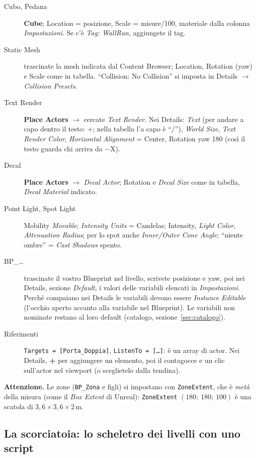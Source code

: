 \documentclass[a4paper,10pt]{article}
\newcommand{\nodo}[1]{\textsf{\textbf{#1}}}
\newcommand{\var}[1]{\texttt{#1}}
\newcommand{\tasto}[1]{\fbox{\footnotesize\textsf{#1}}}
\newcommand{\attenzione}[1]{\par\smallskip\noindent\colorbox{orange!12}{\parbox{\dimexpr\linewidth-2\fboxsep}{\small\textbf{Attenzione.} #1}}\par\smallskip}
\begin{document}
\begin{description}
  \item[Cubo, Pedana] \nodo{Cube}; Location = posizione, Scale = misure/100, materiale dalla colonna \emph{Impostazioni}. Se c'è \emph{Tag: WallRun}, aggiungete il tag.
  \item[Static Mesh] trascinate la mesh indicata dal Content Browser; Location, Rotation (yaw) e Scale come in tabella. ``Collision: No Collision'' si imposta in Details $\rightarrow$ \emph{Collision Presets}.
  \item[Text Render] \nodo{Place Actors} $\rightarrow$ cercate \emph{Text Render}. Nei Details: \emph{Text} (per andare a capo dentro il testo: \tasto{Shift}+\tasto{Invio}; nella tabella l'a capo è ``/''), \emph{World Size}, \emph{Text Render Color}, \emph{Horizontal Alignment} = Center, Rotation yaw 180 (così il testo guarda chi arriva da $-$X).
  \item[Decal] \nodo{Place Actors} $\rightarrow$ \emph{Decal Actor}; Rotation e \emph{Decal Size} come in tabella, \emph{Decal Material} indicato.
  \item[Point Light, Spot Light] Mobility \emph{Movable}; \emph{Intensity Units} = Candelas; Intensity, \emph{Light Color}, \emph{Attenuation Radius}; per lo spot anche \emph{Inner/Outer Cone Angle}; ``niente ombre'' = \emph{Cast Shadows} spento.
  \item[BP\_\dots] trascinate il vostro Blueprint nel livello, scrivete posizione e yaw, poi nei Details, sezione \emph{Default}, i valori delle variabili elencati in \emph{Impostazioni}. Perché compaiano nei Details le variabili devono essere \emph{Instance Editable} (l'occhio aperto accanto alla variabile nel Blueprint). Le variabili non nominate restano al loro default (catalogo, sezione~\ref{sec:catalogo}).
  \item[Riferimenti] \var{Targets = [Porta\_Doppia]}, \var{ListenTo = [\dots]}: è un array di actor. Nei Details, \nodo{+} per aggiungere un elemento, poi il contagocce e un clic sull'actor nel viewport (o sceglietelo dalla tendina).
\end{description}

\attenzione{Le zone (\var{BP\_Zona} e figli) si impostano con \var{ZoneExtent}, che è \emph{metà} della misura (come il \emph{Box Extent} di Unreal): \var{ZoneExtent} $(180;\ 180;\ 100)$ è una scatola di $3{,}6 \times 3{,}6 \times 2$\,m.}

\subsection{La scorciatoia: lo scheletro dei livelli con uno script}
\end{document}
